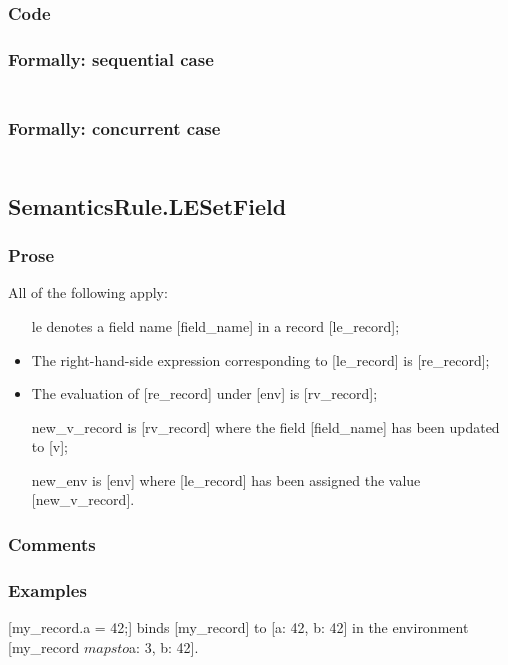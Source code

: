 \documentclass{book}
\begin{document}
  \subsubsection{Code}

  \subsubsection{Formally: sequential case}
  \begin{align}
  \end{align} 

  \subsubsection{Formally: concurrent case}
  \begin{align}
  \end{align} 

\subsection{SemanticsRule.LESetField \label{sec:SemanticsRule.LESetField}}

    \subsubsection{Prose}
    All of the following apply:
    \begin{itemize}
    \item [le] denotes a field name [field\_name] in a record [le\_record];
    \item The right-hand-side expression corresponding to [le\_record] is
      [re\_record];
    \item The evaluation of [re\_record] under [env] is [rv\_record];
    \item [new\_v\_record] is [rv\_record] where the field [field\_name] has been
      updated to [v];
    \item [new\_env] is [env] where [le\_record] has been assigned the value
      [new\_v\_record].
    \end{itemize}

    \subsubsection{Comments}

    \subsubsection{Examples}
    [my\_record.a = 42;] binds [my\_record] to [{a: 42, b: 42}] in the environment [my\_record $mapsto${a: 3, b: 42}].
\end{document}
